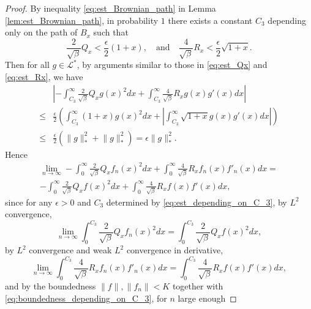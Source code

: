 \documentclass[11pt, a4paper]{article}
\numberwithin{equation}{section}
\newcommand{\Lstar}{\mathcal{L}^*}
\theoremstyle{definition}
\theoremstyle{remark}
\begin{document}
\begin{proof}
  By inequality \eqref{eq:est_Brownian_path} in Lemma \ref{lem:est_Brownian_path}, in probability $1$ there exists a constant $C_3$ depending only on the path of $B_x$ such that
  \begin{equation} \label{eq:est_depending_on_C_3}
    \frac{2}{\sqrt{\beta}} Q_x < \frac{\epsilon}{2}(1 + x), \quad \text{and} \quad \frac{4}{\sqrt{\beta}} R_x < \frac{\epsilon}{2} \sqrt{1 + x}.
  \end{equation}
  Then for all $g \in \Lstar$, by arguments similar to those in \eqref{eq:est_Qx} and \eqref{eq:est_Rx}, we have
  \begin{equation} \label{eq:boundedness_depending_on_C_3}
    \begin{split}
      & \left\lvert -\int^{\infty}_{C_3} \frac{2}{\sqrt{\beta}} Q_x g(x)^2 dx + \int^{\infty}_{C_3} \frac{4}{\sqrt{\beta}} R_x g(x)g'(x) dx \right\rvert \\
      \leq & \frac{\epsilon}{2} \left( \int^{\infty}_{C_3} (1 + x) g(x)^2 dx + \left\lvert \int^{\infty}_{C_3} \sqrt{1 + x} g(x)g'(x) dx \right\rvert \right) \\
      \leq & \frac{\epsilon}{2}(\lVert g \rVert^2_* + \lVert g \rVert^2_*) = \epsilon \lVert g \rVert^2_*.
    \end{split}
  \end{equation}
 Hence
 \begin{multline} \label{eq:limit_of_f_n_extra}
   \lim_{n \to \infty} -\int^{\infty}_0 \frac{2}{\sqrt{\beta}} Q_x f_n(x)^2 dx + \int^{\infty}_0 \frac{4}{\sqrt{\beta}} R_x f_n(x)f'_n(x) dx = \\
   -\int^{\infty}_0 \frac{2}{\sqrt{\beta}} Q_x f(x)^2 dx + \int^{\infty}_0 \frac{4}{\sqrt{\beta}} R_x f(x)f'(x) dx,
 \end{multline}
 since for any $\epsilon > 0$ and $C_3$ determined by \eqref{eq:est_depending_on_C_3}, by $L^2$ convergence,
  \begin{equation}
    \lim_{n \to \infty} \int^{C_3}_0 \frac{2}{\sqrt{\beta}} Q_x f_n(x)^2 dx = \int^{C_3}_0 \frac{2}{\sqrt{\beta}} Q_x f(x)^2 dx,
  \end{equation}
  by $L^2$ convergence and weak $L^2$ convergence in derivative,
  \begin{equation}
    \lim_{n \to \infty} \int^{C_3}_0 \frac{4}{\sqrt{\beta}} R_x f_n(x)f'_n(x) dx = \int^{C_3}_0 \frac{4}{\sqrt{\beta}} R_x f(x)f'(x) dx,
  \end{equation}
  and by the boundedness $\lVert f  \rVert, \lVert f_n \rVert < K$ together with \eqref{eq:boundedness_depending_on_C_3}, for $n$ large enough

\end{proof}
\end{document}
